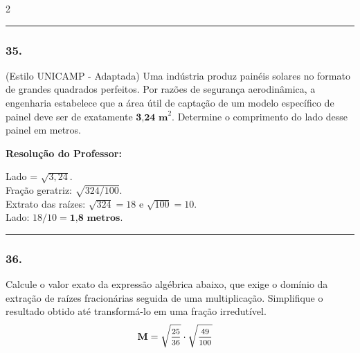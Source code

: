 \begin{multicols*}{2}
\par\vspace{\espacoQuestao}

\noindent\textcolor{CorLinha}{\rule{\linewidth}{0.5pt}} 
\par\vspace{\espacoPreQuestao}
\subsubsection*{35.} (Estilo UNICAMP - Adaptada) Uma indústria produz painéis solares no formato de grandes quadrados perfeitos. Por razões de segurança aerodinâmica, a engenharia estabelece que a área útil de captação de um modelo específico de painel deve ser de exatamente $ \textbf{3,24 m}^{2} $. Determine o comprimento do lado desse painel em metros.

\ifgabarito
    \begin{tcolorbox}[colback=CorTitUm!5, colframe=CorTitUm, boxrule=1pt, arc=4pt, left=6pt, right=6pt, top=6pt, bottom=6pt]
    \small\textbf{\textcolor{CorTitUm}{Resolução do Professor:}}\par\vspace{0.1cm}
    \color{CinzaEscuro}
    Lado = $ \sqrt{3,24} $.\\
    Fração geratriz: $ \sqrt{324 / 100} $.\\
    Extrato das raízes: $ \sqrt{324} = 18 $ e $ \sqrt{100} = 10 $.\\
    Lado: $ 18 / 10 = \textbf{1,8 metros} $.
    \end{tcolorbox}
\fi

\par\vspace{\espacoQuestao}

\noindent\textcolor{CorLinha}{\rule{\linewidth}{0.5pt}} 
\par\vspace{\espacoPreQuestao}
\subsubsection*{36.} Calcule o valor exato da expressão algébrica abaixo, que exige o domínio da extração de raízes fracionárias seguida de uma multiplicação. Simplifique o resultado obtido até transformá-lo em uma fração irredutível.
$$
\begin{aligned}
& \textbf{M} = \sqrt{\mfrac{25}{36}} \cdot \sqrt{\mfrac{49}{100}}
\end{aligned}
$$


\end{multicols*}
